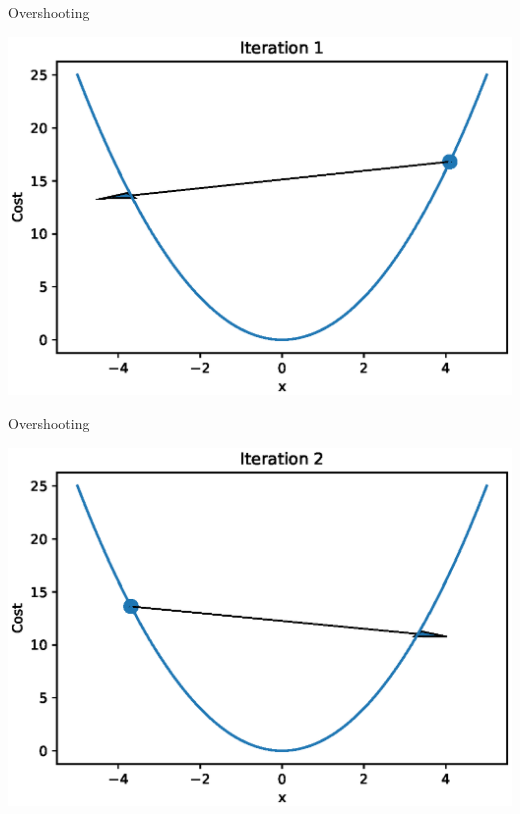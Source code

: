 \documentclass{beamer}
\begin{document}
\begin{frame}{Overshooting}
  \begin{center}
       \includegraphics[totalheight=6cm]{gradient-descent/overshooting-1.eps}
   \end{center}
\end{frame}

\begin{frame}{Overshooting}
  \begin{center}
       \includegraphics[totalheight=6cm]{gradient-descent/overshooting-2.eps}
   \end{center}
\end{frame}
\end{document}
